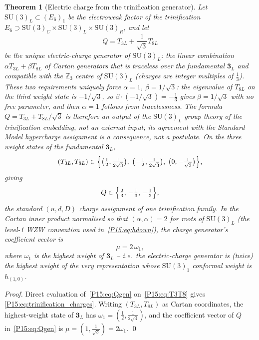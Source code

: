 \documentclass[11pt,a4paper]{article}
\newtheorem{theorem}{Theorem}[section]
\theoremstyle{definition}\newtheorem{definition}[theorem]{Definition}
\theoremstyle{remark}
\newcommand{\SU}{\mathrm{SU}}
\begin{document}
\begin{theorem}[Electric charge from the trinification generator]
\label{P15:thm:charge_generator}
Let $\SU(3)_L\subset(E_6)_1$ be the electroweak factor of the
trinification $E_6\supset\SU(3)_C\times\SU(3)_L\times\SU(3)_R$, and
let
\begin{equation}
  Q = T_{3L}+\frac{1}{\sqrt3}T_{8L}
  \label{P15:eq:Qgen}
\end{equation}
be the unique electric-charge generator of\/ $\SU(3)_L$:
the linear combination $\alpha T_{3L}+\beta T_{8L}$ of Cartan
generators that is traceless over the fundamental $\mathbf{3}_L$
and compatible with the $\mathbb{Z}_3$ centre of\/ $\SU(3)_L$
(charges are integer multiples of $\tfrac{1}{3}$).
These two requirements uniquely force $\alpha=1$,
$\beta=1/\!\sqrt{3}$: the eigenvalue of $T_{8L}$ on the
third weight state is $-1/\!\sqrt{3}$, so
$\beta\cdot(-1/\!\sqrt{3})=-\tfrac{1}{3}$ gives $\beta=1/\!\sqrt{3}$
with no free parameter, and then $\alpha=1$ follows from
tracelessness.
The formula $Q=T_{3L}+T_{8L}/\!\sqrt{3}$ is therefore an output
of the $\SU(3)_L$ group theory of the trinification embedding,
not an external input; its agreement with the Standard Model
hypercharge assignment is a consequence, not a postulate.
On the three weight states of the fundamental $\mathbf{3}_L$,
\begin{equation}
  (T_{3L},T_{8L}) \in
  \Bigl\{\bigl(\tfrac12,\tfrac{1}{2\sqrt3}\bigr),\;
         \bigl(-\tfrac12,\tfrac{1}{2\sqrt3}\bigr),\;
         \bigl(0,-\tfrac{1}{\sqrt3}\bigr)\Bigr\},
  \label{P15:eq:T3T8}
\end{equation}
giving
\begin{equation}
  Q \in \Bigl\{\tfrac{2}{3},\,-\tfrac{1}{3},\,-\tfrac{1}{3}\Bigr\},
  \label{P15:eq:trinification_charges}
\end{equation}
the standard $(u,d,D)$ charge assignment of one trinification
family. In the Cartan inner product normalised so that
$(\alpha,\alpha)=2$ for roots of $\SU(3)_L$ (the level-1 WZW
convention used in~\eqref{P15:eq:hdown}), the charge generator's
coefficient vector is
\begin{equation}
  \mu = 2\,\omega_1,
  \label{P15:eq:mu_omega1}
\end{equation}
where $\omega_1$ is the highest weight of $\mathbf{3}_L$ -- i.e.\
the electric-charge generator is (twice) the highest weight of the
very representation whose $\SU(3)_1$ conformal weight is
$h_{(1,0)}$.
\end{theorem}

\begin{proof}
Direct evaluation of~\eqref{P15:eq:Qgen} on~\eqref{P15:eq:T3T8} gives
\eqref{P15:eq:trinification_charges}.
Writing $(T_{3L},T_{8L})$ as Cartan coordinates, the highest-weight
state of $\mathbf{3}_L$ has $\omega_1=(\tfrac12,\tfrac{1}{2\sqrt3})$,
and the coefficient vector of $Q$ in~\eqref{P15:eq:Qgen} is
$\mu=(1,\tfrac{1}{\sqrt3})=2\omega_1$. \qed
\end{proof}
\end{document}
